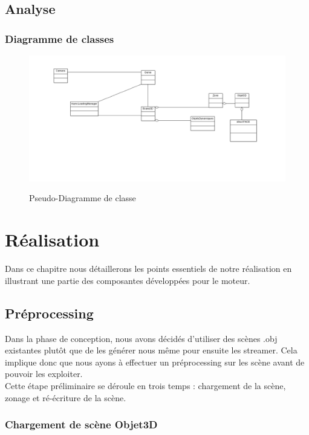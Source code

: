 \documentclass{report}
\begin{document}
		\section{Analyse}		
			\subsection{Diagramme de classes}
				
				\begin{figure}[!h]
						\centering
						\includegraphics[scale=0.5]{images/ClassDiagram.png}\\
						\caption{Pseudo-Diagramme de classe}
						\label{Pseudo-Diagramme de classe}
				\end{figure}						
	
	\chapter{Réalisation}
		Dans ce chapitre nous détaillerons les points essentiels de notre réalisation en illustrant une partie des composantes développées pour le moteur.
		\section{Préprocessing}
		Dans la phase de conception, nous avons décidés d'utiliser des scènes .obj existantes plutôt que de les générer nous même pour ensuite les streamer. Cela implique donc que nous ayons à effectuer un préprocessing sur les scène avant de pouvoir les exploiter.\\
	Cette étape préliminaire se déroule en trois temps : chargement de la scène, zonage et ré-écriture de la scène.
			\subsection{Chargement de scène Objet3D}
\end{document}

